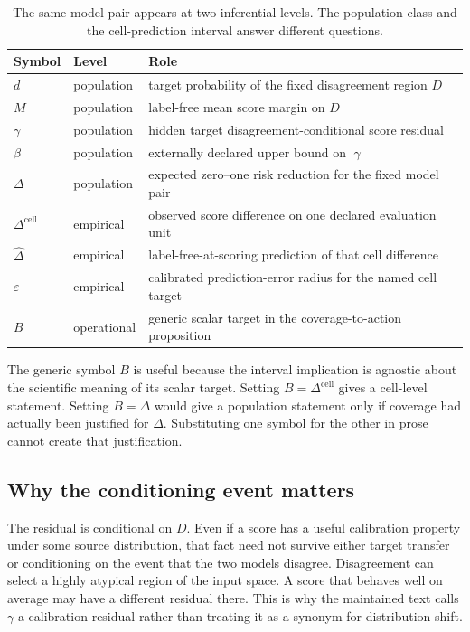 \begin{table}[!t]
\centering
\small
\caption{The same model pair appears at two inferential levels.  The population class and the
cell-prediction interval answer different questions.}
\label{fr:tab-symbol-atlas}
\begin{tabular}{@{}p{}p{}p{}@{}}
\toprule
Symbol & Level & Role \\
\midrule
$d$ & population & target probability of the fixed disagreement region $D$ \\
$M$ & population & label-free mean score margin on $D$ \\
$\gamma$ & population & hidden target disagreement-conditional score residual \\
$\beta$ & population & externally declared upper bound on $|\gamma|$ \\
$\Delta$ & population & expected zero--one risk reduction for the fixed model pair \\
$\Delta^{\mathrm{cell}}$ & empirical & observed score difference on one declared evaluation unit \\
$\widehat\Delta$ & empirical & label-free-at-scoring prediction of that cell difference \\
$\varepsilon$ & empirical & calibrated prediction-error radius for the named cell target \\
$B$ & operational & generic scalar target in the coverage-to-action proposition \\
\bottomrule
\end{tabular}
\end{table}

The generic symbol $B$ is useful because the interval implication is agnostic about the scientific
meaning of its scalar target.  Setting $B=\Delta^{\mathrm{cell}}$ gives a cell-level statement.
Setting $B=\Delta$ would give a population statement only if coverage had actually been justified
for $\Delta$.  Substituting one symbol for the other in prose cannot create that justification.

\subsection{Why the conditioning event matters}
\label{fr:subsec-conditioning}

The residual is conditional on $D$.  Even if a score has a useful calibration property under some
source distribution, that fact need not survive either target transfer or conditioning on the
event that the two models disagree.  Disagreement can select a highly atypical region of the input
space.  A score that behaves well on average may have a different residual there.  This is why the
maintained text calls $\gamma$ a calibration residual rather than treating it as a synonym for
distribution shift.

